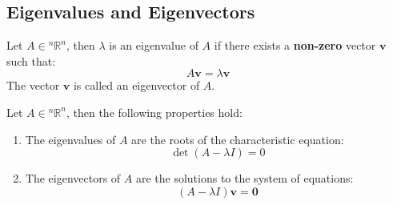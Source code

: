 \documentclass[11pt]{report}
\begin{document}
\subsection{Eigenvalues and Eigenvectors}
\begin{definition}
    Let $A \in {^n\mathbb{R}^n}$, then $\lambda$ is an eigenvalue of $A$ if there exists a \textbf{non-zero} vector $\textbf{v}$ such that:
    \begin{equation}
        A\textbf{v} = \lambda \textbf{v}
    \end{equation}
    The vector $\textbf{v}$ is called an eigenvector of $A$.
\end{definition}
\begin{theorem}
    Let $A \in {^n\mathbb{R}^n}$, then the following properties hold:
    \begin{enumerate}
        \item The eigenvalues of $A$ are the roots of the characteristic equation:
        \begin{equation}
            \det(A - \lambda I) = 0
        \end{equation}
        \item The eigenvectors of $A$ are the solutions to the system of equations:
        \begin{equation}
            (A - \lambda I)\textbf{v} = \textbf{0}
        \end{equation}
    \end{enumerate}
\end{theorem}
\end{document}
